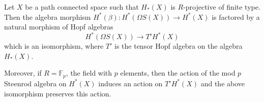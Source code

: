 Let $X$ be a path connected space such that $H_*(X)$ is $R$-projective of finite type. Then the algebra morphism $H^*(\beta): H^*(\Omega S(X)) \to H^*(X)$ is factored by a natural morphism of Hopf algebras
$$H^*(\Omega S(X)) \to T'H^*(X)$$
which is an isomorphism, where $T'$ is the tensor Hopf algebra on the algebra $H_*(X)$.

Moreover, if $R = \mathbb{F}_p$, the field with $p$ elements, then the action of the mod $p$ Steenrod algebra on $H^*(X)$ induces an action on $T'H^*(X)$ and the above isomorphism preserves this action.
